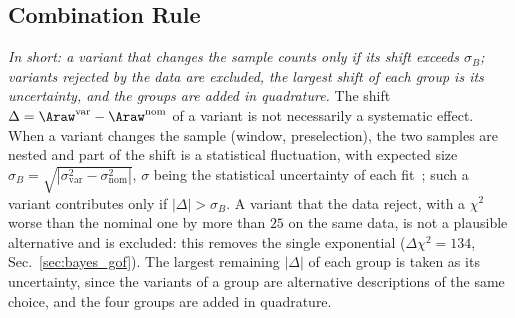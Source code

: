 \subsection{Combination Rule}
\emph{In short: a variant that changes the sample counts only if its shift exceeds $\sigma_B$; variants rejected by the data are excluded, the largest shift of each group is its uncertainty, and the groups are added in quadrature.}
The shift $\Delta=\Araw^{\mathrm{var}}-\Araw^{\mathrm{nom}}$ of a variant is not necessarily a systematic effect. When a variant changes the sample (window, preselection), the two samples are nested and part of the shift is a statistical fluctuation, with expected size $\sigma_B=\sqrt{|\sigma_{\mathrm{var}}^2-\sigma_{\mathrm{nom}}^2|}$, $\sigma$ being the statistical uncertainty of each fit~\cite{barlow}; such a variant contributes only if $|\Delta|>\sigma_B$. A variant that the data reject, with a $\chi^2$ worse than the nominal one by more than $25$ on the same data, is not a plausible alternative and is excluded: this removes the single exponential ($\Delta\chi^2=134$, Sec.~\ref{sec:bayes_gof}). The largest remaining $|\Delta|$ of each group is taken as its uncertainty, since the variants of a group are alternative descriptions of the same choice, and the four groups are added in quadrature.

